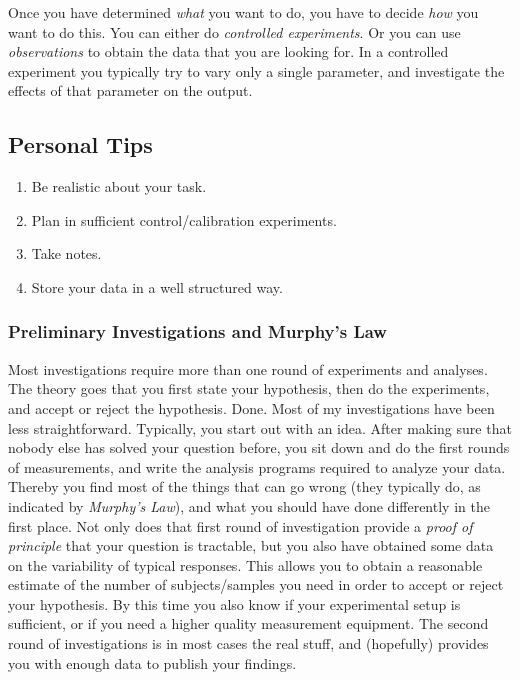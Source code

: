 Once you have determined \emph{what} you want to do, you have to decide \emph{how} you want to do this. You can either do \emph{controlled experiments}. Or you can use \emph{observations} to obtain the data that you are looking for. In a controlled experiment you typically try to vary only a single parameter, and investigate the effects of that parameter on the output.

\subsection{Personal Tips}

\begin{enumerate}
  \item Be realistic about your task.
  \item Plan in sufficient control/calibration experiments.
  \item Take notes.
  \item Store your data in a well structured way.
\end{enumerate}

\subsubsection{Preliminary Investigations and Murphy's Law}
Most investigations require more than one round of experiments and analyses. The theory goes that you first state your hypothesis, then do the experiments, and accept or reject the hypothesis. Done.
Most of my investigations have been less straightforward. Typically, you start out with an idea. After making sure that nobody else has solved your question before, you sit down and do the first rounds of measurements, and write the analysis programs required to analyze your data. Thereby you find most of the things that can go wrong (they typically do, as indicated by \emph{Murphy's Law}), and what you should have done differently in the first place. Not only does that first round of investigation provide a \emph{proof of principle} that your question is tractable, but you also have obtained some data on the variability of typical responses. This allows you to obtain a reasonable estimate of the number of subjects/samples you need in order to accept or reject your hypothesis. By this time you also know if your experimental setup is sufficient, or if you need a higher quality measurement equipment. The second round of investigations is in most cases the real stuff, and (hopefully) provides you with enough data to publish your findings.

